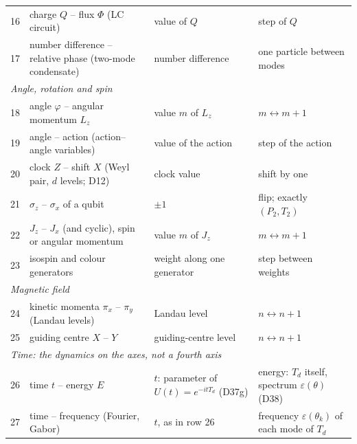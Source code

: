 \documentclass[11pt,a4paper]{article}
\newcommand{\leanus}{\textunderscore\allowbreak}
\newcommand{\lean}[1]{{\small\ttfamily\let\_\leanus #1}}
\begin{document}
\begin{center}
\begin{longtable}{r>{\raggedright}p{6.2cm}>{\raggedright}p{3.9cm}>{\raggedright\arraybackslash}p{3.9cm}}
16 & charge $Q$ -- flux $\Phi$ (LC circuit) & value of $Q$ & step of $Q$ \\
17 & number difference -- relative phase (two-mode condensate) & number difference & one particle between modes \\
\midrule
\multicolumn{4}{l}{\emph{Angle, rotation and spin}} \\
18 & angle $\varphi$ -- angular momentum $L_z$ & value $m$ of $L_z$ & $m\leftrightarrow m{+}1$ \\
19 & angle -- action (action--angle variables) & value of the action & step of the action \\
20 & clock $Z$ -- shift $X$ (Weyl pair, $d$ levels; \lean{D12}) & clock value & shift by one \\
21 & $\sigma_z$ -- $\sigma_x$ of a qubit & $\pm1$ & flip; exactly $(P_2,T_2)$ \\
22 & $J_z$ -- $J_x$ (and cyclic), spin or angular momentum & value $m$ of $J_z$ & $m\leftrightarrow m{+}1$ \\
23 & isospin and colour generators & weight along one generator & step between weights \\
\midrule
\multicolumn{4}{l}{\emph{Magnetic field}} \\
24 & kinetic momenta $\pi_x$ -- $\pi_y$ (Landau levels) & Landau level & $n\leftrightarrow n{+}1$ \\
25 & guiding centre $X$ -- $Y$ & guiding-centre level & $n\leftrightarrow n{+}1$ \\
\midrule
\multicolumn{4}{l}{\emph{Time: the dynamics on the axes, not a fourth axis}} \\
26 & time $t$ -- energy $E$ & $t$: parameter of $U(t)=e^{-itT_d}$ (\lean{D37g}) & energy: $T_d$ itself, spectrum $\varepsilon(\theta)$ (\lean{D38}) \\
27 & time -- frequency (Fourier, Gabor) & $t$, as in row 26 & frequency $\varepsilon(\theta_k)$ of each mode of $T_d$ \\
\bottomrule
\end{longtable}
\end{center}
\end{document}
